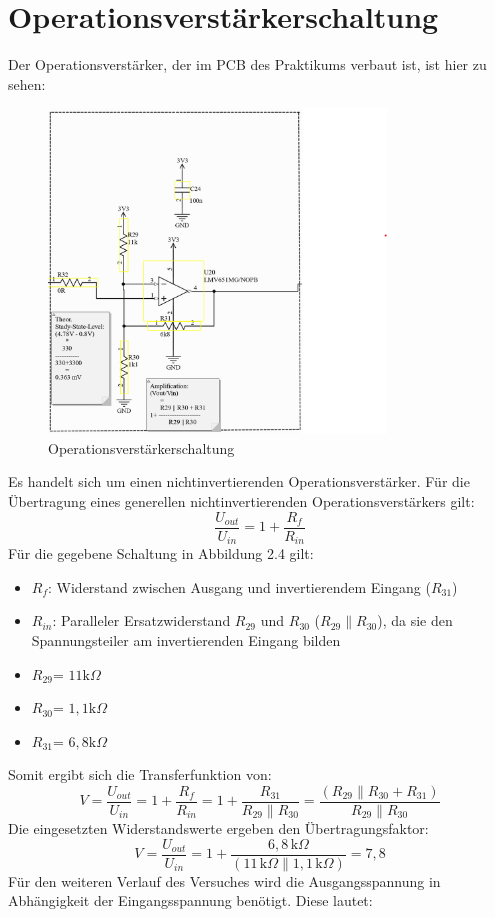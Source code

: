 \section{Operationsverstärkerschaltung} %
Der Operationsverstärker, der im PCB des Praktikums verbaut ist, ist hier zu sehen:
\begin{figure}[H]
    \centering
    \includegraphics[width=0.8\textwidth]{Pictures/OP_Verstaerker.png}
    \caption{Operationsverstärkerschaltung}
    \label{fig:opamp_schaltung}
\end{figure}
Es handelt sich um einen nichtinvertierenden Operationsverstärker.
Für die Übertragung eines generellen nichtinvertierenden Operationsverstärkers gilt:
\begin{equation}
    \frac{U_{out}}{U_{in}} = 1 + \frac{R_f}{R_{in}}
\end{equation}
Für die gegebene Schaltung in Abbildung 2.4 gilt:
\begin{itemize}
    \item $R_f$: Widerstand zwischen Ausgang und invertierendem Eingang ($R_{31}$)
    \item $R_{in}$: Paralleler Ersatzwiderstand $R_{29}$ und $R_{30}$ ($R_{29}\parallel R_{30}$), da sie den Spannungsteiler am invertierenden Eingang bilden
    \item $R_{29}$= $11 \mathrm{k}\Omega$
    \item $R_{30}$= $1,1 \mathrm{k}\Omega$
    \item $R_{31}$= $6,8 \mathrm{k}\Omega$
\end{itemize}
Somit ergibt sich die Transferfunktion von:
\begin{equation}
    V = \frac{U_{out}}{U_{in}} = 1 + \frac{R_f}{R_{in}} = 1 + \frac{R_{31}}{R_{29}\parallel R_{30}}=\frac{(R_{29} \parallel R_{30}+R_{31})}{R_{29}\parallel R_{30}}
\end{equation}
Die eingesetzten Widerstandswerte ergeben den Übertragungsfaktor:
\begin{equation}
    V = \frac{U_{out}}{U_{in}} = 1 + \frac{6,8\,\mathrm{k}\Omega}{(11\,\mathrm{k}\Omega \parallel 1,1\,\mathrm{k}\Omega)} = 7,8
\end{equation}
Für den weiteren Verlauf des Versuches wird die Ausgangsspannung in Abhängigkeit der Eingangsspannung benötigt. Diese lautet:

